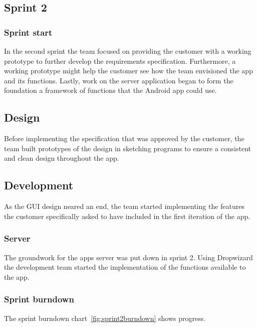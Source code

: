 \subsection{Sprint 2}

\subsubsection{Sprint start}
In the second sprint the team focused on providing the customer with a working
prototype to further develop the requirements specification. Furthermore, a
working prototype might help the customer see how the team envisioned the app
and its functions. Lastly, work on the server application began to form the
foundation a framework of functions that the Android app could use.

\subsection{Design}
Before implementing the specification that was approved by the customer, the
team built prototypes of the design in sketching programs to ensure a consistent
and clean design throughout the app. 

\subsection{Development}
As the GUI design neared an end, the team started implementing the features the
customer specifically asked to have included in the first iteration of the app.

\subsubsection{Server}
The groundwork for the apps server was put down in sprint 2. Using Dropwizard
the development team started the implementation of the functions available to
the app.

\subsubsection{Sprint burndown}

The sprint burndown chart~\ref{fig:sprint2burndown} shows progress.

